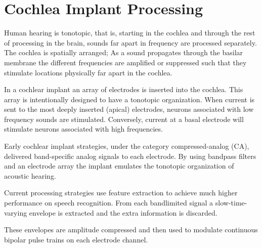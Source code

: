 \documentclass [11pt, proquest,oneside] {ganter_thesis}[2015/03/03]
\begin{document}

\chapter{Cochlea Implant Processing}

Human hearing is tonotopic, that is, starting in the cochlea and through the rest of processing in the brain, sounds far apart in frequency are processed separately.  The cochlea is spatially arranged; As a sound propagates through the basilar membrane the different frequencies are amplified or suppressed such that they stimulate locations physically far apart in the cochlea.


In a cochlear implant an array of electrodes is inserted into the cochlea.  This array is intentionally designed to have a tonotopic organization.  When current is sent to the most deeply inserted (apical) electrodes, neurons associated with low frequency sounds are stimulated.  Conversely, current at a basal electrode will stimulate neurons associated with high frequencies.

Early cochlear implant strategies, under the category compressed-analog (CA), delivered band-specific analog signals to each electrode.  By using bandpass filters and an electrode array the implant emulates the tonotopic organization of acoustic hearing.

Current processing strategies use feature extraction to achieve much higher performance on speech recognition.  From each bandlimited signal a slow-time-varying envelope is extracted and the extra information is discarded.

These envelopes are amplitude compressed and then used to modulate continuous bipolar pulse trains on each electrode channel.
\end{document}
